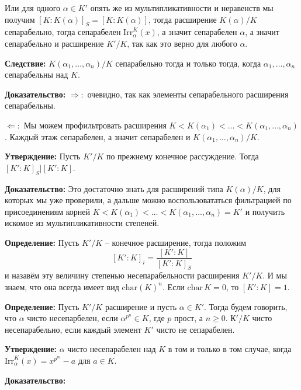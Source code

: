 \documentclass[a4paper, 12pt]{book}
\begin{document}
Или для одного $\alpha\in K'$ опять же из мультипликативности и неравенств мы
получим $[K:K(\alpha)]_S=[K:K(\alpha)]$, тогда расширение $K(\alpha)/K$
сепарабельно, тогда сепарабелен $\text{Irr}_\alpha^K(x)$, а значит сепарабелен
$\alpha$, а значит сепарабельно и расширение $K'/K$, так как это верно для
любого $\alpha$.

\textbf{Следствие:} $K(\alpha_1,\ldots,\alpha_n)/K$ сепарабельно тогда и только
тогда, когда $\alpha_1,\ldots,\alpha_n$ сепарабельны над $K$.

\textbf{Доказательство:} $\Rightarrow:$ очевидно, так как элементы
сепарабельного расширения сепарабельны.

$\Leftarrow:$ Мы можем профильтровать расширения $K<K(\alpha_1)<\ldots<K(\alpha_1,
\ldots,\alpha_n)$. Каждый этаж сепарабелен, а значит сепарабелен и $K(\alpha_1,
\ldots,\alpha_n)/K$.

\textbf{Утверждение:} Пусть $K'/K$ по прежнему конечное рассуждение. Тогда
$[K':K]_S | [K':K]$.

\textbf{Доказательство:} Это достаточно знать для расширений типа $K(\alpha)/K$,
для которых мы уже проверили, а дальше можно воспользовататься фильтрацией по
присоединениям корней $K<K(\alpha_1)<\ldots<K(\alpha_1,\ldots,\alpha_n)=K'$ и
получить искомое из мультипликативности степеней.

\textbf{Определение:} Пусть $K'/K$ – конечное расширение, тогда положим
\[[K':K]_i=\frac{[K':K]}{[K':K]_S}\]
и назавём эту величину степенью несепарабельности расширения $K'/K$. И мы знаем,
что она всегда имеет вид $\text{char}(K)^n$. Если $\text{char}\,K=0$, то $[K':K]
=1$.

\textbf{Определение:} Пусть $K'/K$ расширение и пусть $\alpha\in K'$. Тогда
будем говорить, что $\alpha$ чисто несепарбелен, если $\alpha^{p^n}\in K$, где
$p$ прост, а $n\geq 0$. $К'/K$ чисто несепарабельно, если каждый элемент $K'$ чисто не
сепарабелен.

\textbf{Утверждение:} $\alpha$ чисто несепарабелен над $K$ в том и только в том
случае, когда $\text{Irr}_\alpha^K(x)=x^{p^m}-a$ для $a\in K$.

\textbf{Доказательство:}
\end{document}
